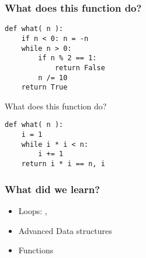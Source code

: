 \documentclass[14pt,compress]{beamer}
\newcommand{\kwrd}[1]{ \texttt{\textbf{\color{blue}{#1}}}  }
\begin{document}
\begin{frame}[fragile]
  \frametitle {What does this function do?}
  \begin{lstlisting}
def what( n ):
    if n < 0: n = -n
    while n > 0:
        if n % 2 == 1:
            return False
        n /= 10
    return True
  \end{lstlisting}
\end{frame} 

\begin{frame}[fragile]
  {What does this function do?}
\begin{lstlisting}
def what( n ):
    i = 1
    while i * i < n:
        i += 1
    return i * i == n, i
  \end{lstlisting}
\end{frame}

\begin{frame}
  \frametitle{What did we learn?}
  \begin{itemize}
    \item Loops: \kwrd{while}, \kwrd{for}
    \item Advanced Data structures
    \item Functions
  \end{itemize}
\end{frame}
\end{document}
